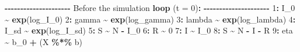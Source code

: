 \documentclass[
11pt, %
oneside, %
english, %
singlespacing, %
]{macthesis} %
\newenvironment{Shaded}{\begin{snugshade}}{\end{snugshade}}
\newcommand{\AttributeTok}[1]{\textcolor[rgb]{0.13,0.29,0.53}{#1}}
\newcommand{\DecValTok}[1]{\textcolor[rgb]{0.00,0.00,0.81}{#1}}
\newcommand{\FunctionTok}[1]{\textcolor[rgb]{0.13,0.29,0.53}{\textbf{#1}}}
\newcommand{\NormalTok}[1]{#1}
\newcommand{\SpecialCharTok}[1]{\textcolor[rgb]{0.81,0.36,0.00}{\textbf{#1}}}
\begin{document}
\begin{Shaded}
\begin{Highlighting}[]
\SpecialCharTok{{-}{-}{-}{-}{-}{-}{-}{-}{-}{-}{-}{-}{-}{-}{-}{-}{-}{-}{-}{-}{-}}
\NormalTok{Before the simulation }\FunctionTok{loop}\NormalTok{ (}\AttributeTok{t =} \DecValTok{0}\NormalTok{)}\SpecialCharTok{:}
\SpecialCharTok{{-}{-}{-}{-}{-}{-}{-}{-}{-}{-}{-}{-}{-}{-}{-}{-}{-}{-}{-}{-}{-}}
\DecValTok{1}\SpecialCharTok{:}\NormalTok{ I\_0 }\SpecialCharTok{\textasciitilde{}} \FunctionTok{exp}\NormalTok{(log\_I\_0)}
\DecValTok{2}\SpecialCharTok{:}\NormalTok{ gamma }\SpecialCharTok{\textasciitilde{}} \FunctionTok{exp}\NormalTok{(log\_gamma)}
\DecValTok{3}\SpecialCharTok{:}\NormalTok{ lambda }\SpecialCharTok{\textasciitilde{}} \FunctionTok{exp}\NormalTok{(log\_lambda)}
\DecValTok{4}\SpecialCharTok{:}\NormalTok{ I\_sd }\SpecialCharTok{\textasciitilde{}} \FunctionTok{exp}\NormalTok{(log\_I\_sd)}
\DecValTok{5}\SpecialCharTok{:}\NormalTok{ S }\SpecialCharTok{\textasciitilde{}}\NormalTok{ N }\SpecialCharTok{{-}}\NormalTok{ I\_0}
\DecValTok{6}\SpecialCharTok{:}\NormalTok{ R }\SpecialCharTok{\textasciitilde{}} \DecValTok{0}
\DecValTok{7}\SpecialCharTok{:}\NormalTok{ I }\SpecialCharTok{\textasciitilde{}}\NormalTok{ I\_0}
\DecValTok{8}\SpecialCharTok{:}\NormalTok{ S }\SpecialCharTok{\textasciitilde{}}\NormalTok{ N }\SpecialCharTok{{-}}\NormalTok{ I }\SpecialCharTok{{-}}\NormalTok{ R}
\DecValTok{9}\SpecialCharTok{:}\NormalTok{ eta }\SpecialCharTok{\textasciitilde{}}\NormalTok{ b\_0 }\SpecialCharTok{+}\NormalTok{ (X }\SpecialCharTok{\%*\%}\NormalTok{ b)}


\end{Highlighting}
\end{Shaded}
\end{document}
